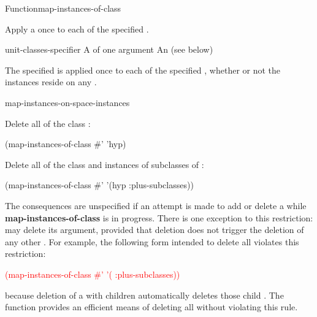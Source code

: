 \documentclass[10pt,twoside,english,pdftex]{article}
\begin{document}
\begin{functiondoc}{Function}{map-instances-of-class}%
{}
%
%

\fnsyntax

\fnpurpose Apply a  once to each  of the
specified . 

\fnpackage {}

\fnmodule {}

\fnargs
\begin{args}{unit-classes-specifier}
\arg[function] A  of one argument
 An 
(see below)
\end{args}

\fndsyntax
\unitclassesspec
\subclassingspec

\fndescription The specified  is applied once to each
 of the specified , whether
or not the instances reside on any .

\begin{alsos}{map-instances-on-space-instances}
\end{alsos}

\fnexamples
Delete all  of the class :
\begin{example}
  (map-instances-of-class #' 'hyp)
\end{example} 

Delete all  of the class  and
instances of subclasses of :
\begin{example}
  (map-instances-of-class #' '(hyp :plus-subclasses))
\end{example} 

\fnnote
{}%
%
The consequences are unspecified if an attempt is made to add or delete a
 while \textbf{map-instances-of-class} is in progress.
There is one exception to this restriction:  may delete its
 argument, provided that deletion does not trigger the
deletion of any other .  For example, the following
form intended to delete all  violates this restriction:
\begin{example}
   \textcolor{red}{(map-instances-of-class 
     #' '( :plus-subclasses))}
\end{example}
because deletion of a  with children automatically
deletes those child .  The function
\textbf{} provides an efficient means of
deleting all  without violating this rule.


\end{functiondoc}
\end{document}
